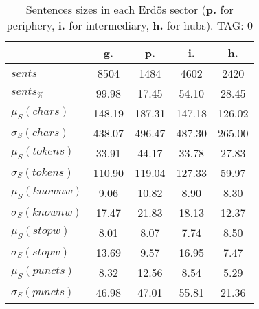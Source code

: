 \begin{table}[h!]
\begin{center}
\begin{tabular}{| l | c | c | c | c |}\hline
 & g. & p. & i. & h. \\\hline
$sents$ & 8504  & 1484  & 4602  & 2420 \\\hline
$sents_{\%}$ & 99.98  & 17.45  & 54.10  & 28.45 \\\hline
$\mu_S(chars)$ & 148.19  & 187.31  & 147.18  & 126.02 \\\hline
$\sigma_S(chars)$ & 438.07  & 496.47  & 487.30  & 265.00 \\\hline
$\mu_S(tokens)$ & 33.91  & 44.17  & 33.78  & 27.83 \\\hline
$\sigma_S(tokens)$ & 110.90  & 119.04  & 127.33  & 59.97 \\\hline
$\mu_S(knownw)$ & 9.06  & 10.82  & 8.90  & 8.30 \\\hline
$\sigma_S(knownw)$ & 17.47  & 21.83  & 18.13  & 12.37 \\\hline
$\mu_S(stopw)$ & 8.01  & 8.07  & 7.74  & 8.50 \\\hline
$\sigma_S(stopw)$ & 13.69  & 9.57  & 16.95  & 7.47 \\\hline
$\mu_S(puncts)$ & 8.32  & 12.56  & 8.54  & 5.29 \\\hline
$\sigma_S(puncts)$ & 46.98  & 47.01  & 55.81  & 21.36 \\\hline
\end{tabular}
\caption{Sentences sizes in each Erd\"os sector ({{\bf p.}} for periphery, {{\bf i.}} for intermediary, {{\bf h.}} for hubs). TAG: 0}
\end{center}
\end{table}